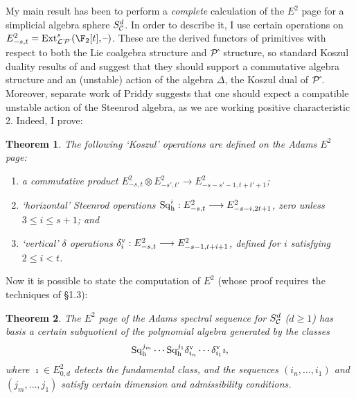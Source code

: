 \documentclass[11pt]{article}
\theoremstyle{plain}
\newtheorem{theorem}{Theorem}
\newcommand{\Sq}{\mathrm{Sq}}
\begin{document}
My main result has been to perform a \emph{complete} calculation of the $E^2$ page for a simplicial algebra sphere $S^d_\calC$. In order to describe it, I use certain operations on $E^2_{-s,t}=\Ext^s_{\calL\hat{\,}\calP\hat{\,}}(\F_2[t],\DASH)$.
These are the derived functors of primitives with respect to both the Lie coalgebra structure and $\calP{\hat\,}$ structure, so standard Koszul duality results of \cite{GinzburgKapranov.pdf} and \cite{PriddyKoszul.pdf} suggest that they should support a commutative algebra structure and an (unstable) action of the algebra $\Delta$, the Koszul dual of $\calP{\hat\,}$. Moreover, separate work of Priddy \cite{PriddySimplicialLie.pdf} suggests that one should expect a compatible unstable action of the Steenrod algebra, as we are working positive characteristic 2. Indeed, I prove:
\begin{theorem}\label{KoszulOperationsDefinedOnE2}
The following `Koszul' operations are defined on the Adams $E^2$ page:
\begin{enumerate}\squishlist
\setlength{\parindent}{.25in}
\item a commutative product $E^2_{-s,t}\otimes E^2_{-s',t'}\to E^2_{-s-s'-1,t+t'+1}$;
\item `horizontal' Steenrod operations $\Sq^i_\textup{h}:E^2_{-s,t}\to E^2_{-s-i,2t+1}$, zero unless $3\leq i\leq s+1$; and
\item `vertical' $\delta$ operations $\delta_i^\textup{v}:E^2_{-s,t}\to E^2_{-s-1,t+i+1}$, defined for $i$ satisfying $2\leq i<t$.
\end{enumerate}
\end{theorem}
\noindent Now it is possible to state the computation of $E^2$ (whose proof requires the techniques of \S1.3):
\begin{theorem}\label{AdamsE2PageCalculation}
The $E^2$ page of the Adams spectral sequence for $S^d_\calC$ ($d\geq1$) has basis a certain subquotient of the polynomial algebra generated by the classes
\[\Sq_\textup{h}^{j_m}\cdots \Sq_\textup{h}^{j_1}\delta^\textup{v}_{i_n}\cdots \delta^\textup{v}_{i_1}\imath,\]
where $\imath\in E^2_{0,d}$ detects the fundamental class, and the sequences $(i_n,\ldots,i_1)$ and $(j_m,\ldots,j_1)$ satisfy certain dimension and admissibility conditions. 
\end{theorem}
\end{document}
